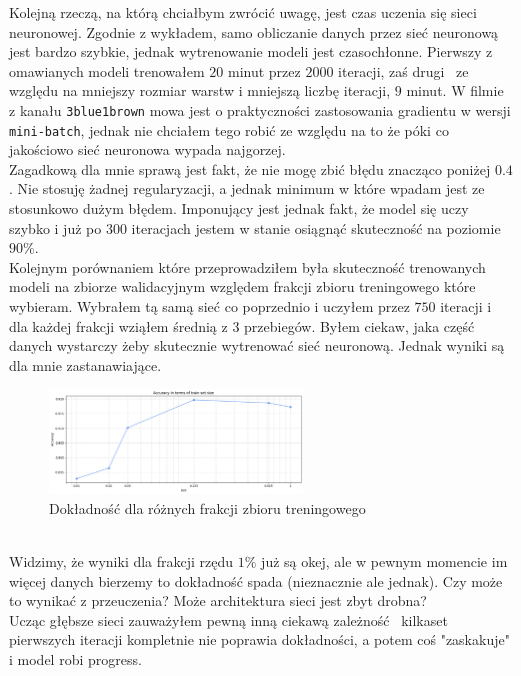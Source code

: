 \documentclass[polish,12pt,a4paper]{extarticle}
\begin{document}
Kolejną rzeczą, na którą chciałbym zwrócić uwagę, jest czas uczenia się sieci neuronowej. Zgodnie z wykładem, samo obliczanie danych przez sieć neuronową jest bardzo szybkie, jednak wytrenowanie modeli jest czasochłonne. Pierwszy z omawianych modeli trenowałem $20$ minut przez $2000$ iteracji, zaś drugi \textendash\, ze względu na mniejszy rozmiar warstw i mniejszą liczbę iteracji, $9$ minut. W filmie z kanału \texttt{3blue1brown} mowa jest o praktyczności zastosowania gradientu w wersji \texttt{mini-batch}, jednak nie chciałem tego robić ze względu na to że póki co jakościowo sieć neuronowa wypada najgorzej. \smallskip \\
Zagadkową dla mnie sprawą jest fakt, że nie mogę zbić błędu znacząco poniżej $0.4$. Nie stosuję żadnej regularyzacji, a jednak minimum w które wpadam jest ze stosunkowo dużym błędem. Imponujący jest jednak fakt, że model się uczy szybko i już po $300$ iteracjach jestem w stanie osiągnąć skuteczność na poziomie $90 \% $. \smallskip \\
Kolejnym porównaniem które przeprowadziłem była skuteczność trenowanych modeli na zbiorze walidacyjnym względem frakcji zbioru treningowego które wybieram. Wybrałem tą samą sieć co poprzednio i uczyłem przez $750$ iteracji i dla każdej frakcji wziąłem średnią z $3$ przebiegów. Byłem ciekaw, jaka część danych wystarczy żeby skutecznie wytrenować sieć neuronową. Jednak wyniki są dla mnie zastanawiające.
\begin{figure}[h!]
    \centering
    \includegraphics[width=0.60\textwidth]{img/neural_different_sizes.png}
    \caption{Dokładność dla różnych frakcji zbioru treningowego}
\end{figure} \FloatBarrier \\
Widzimy, że wyniki dla frakcji rzędu $1\%$ już są okej, ale w pewnym momencie im więcej danych bierzemy to dokładność spada (nieznacznie ale jednak). Czy może to wynikać z przeuczenia? Może architektura sieci jest zbyt drobna? \smallskip \\
Ucząc głębsze sieci zauważyłem pewną inną ciekawą zależność \textendash\, kilkaset pierwszych iteracji kompletnie nie poprawia dokładności, a potem coś "zaskakuje" i model robi progress.
\end{document}
